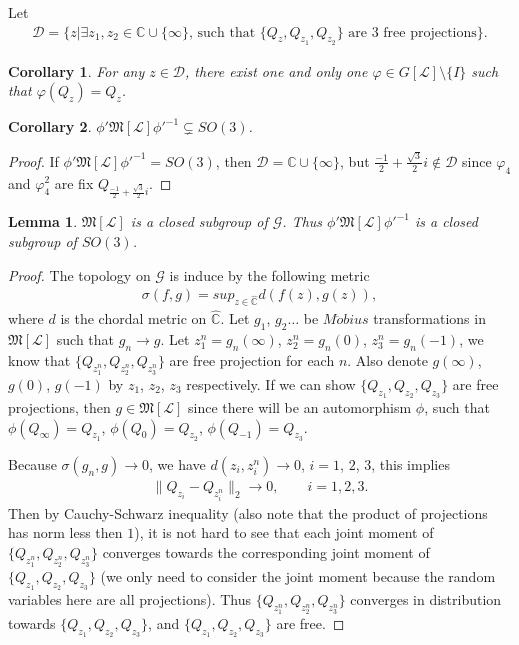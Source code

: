 \documentclass{amsart}
\newcommand{\DDD}{\mathcal D}
\newcommand{\G}{\mathcal G}
\newcommand{\LLL}{\mathcal L} %
\newcommand{\MMM}{\mathfrak M}
\newcommand{\C}{\mathbb C} %
\newtheorem{corollary}{Corollary}[section]
\newtheorem{lemma}{Lemma}[section]
\begin{document}
Let
\begin{align*}
\DDD = \{z | \exists z_1, z_2 \in \C \cup \{\infty \} \mbox{, such that } \{ Q_z, Q_{z_1}, Q_{z_2} \} \mbox{ are 3 free projections} \}.
\end{align*}

\begin{corollary}
For any $z \in \DDD$, there exist one and only one $\varphi \in G[\LLL] \setminus \{I \}$ such that $\varphi(Q_z) = Q_z$.
\end{corollary}

\begin{corollary}
$\phi' \MMM[\LLL] \phi'^{-1} \subsetneq SO(3)$.
\end{corollary}

\begin{proof}
If $\phi' \MMM[\LLL] \phi'^{-1} = SO(3)$, then $\DDD = \C \cup \{\infty \}$, but $\frac{-1}{2} + \frac{\sqrt{3}}{2}i \notin \DDD$ since
$\varphi_4$ and $\varphi_{4}^{2}$ are fix $Q_{\frac{-1}{2} + \frac{\sqrt{3}}{2}i}$.
\end{proof}

\begin{lemma}
$\MMM[\LLL]$ is a closed subgroup of $\G$. Thus $\phi' \MMM[\LLL] \phi'^{-1}$ is a closed subgroup of $SO(3)$.
\end{lemma}

\begin{proof}
The topology on $\G$ is induce by the following metric
\begin{align*}
\sigma(f,g) = sup_{z \in \widehat{\C}}d(f(z), g(z)),
\end{align*}
where $d$ is the chordal metric on $\widehat{\C}$.
Let $g_1$, $g_2 \ldots$ be $M\ddot{o}bius$ transformations in $\MMM[\LLL]$ such that $g_n \rightarrow g$.
Let $z_{1}^{n} = g_n(\infty)$, $z_{2}^{n} = g_n(0)$, $z_{3}^{n} = g_n(-1)$, we know that $\{Q_{z_{1}^{n}}, Q_{z_{2}^{n}},
Q_{z_{3}^{n}} \}$ are free projection for each $n$. Also denote $g(\infty)$, $g(0)$, $g(-1)$ by $z_1$, $z_2$, $z_3$ respectively.
If we can show $\{Q_{z_{1}}, Q_{z_{2}},Q_{z_{3}} \}$ are free projections, then $g \in \MMM[\LLL]$ since there will be an
automorphism $\phi$, such that $\phi(Q_{\infty}) = Q_{z_1}$, $\phi(Q_{0}) = Q_{z_2}$, $\phi(Q_{-1}) = Q_{z_3}$.

Because $\sigma(g_n,g) \rightarrow 0$, we have $d(z_i, z^{n}_{i}) \rightarrow 0$, $i = 1$, $2$, $3$, this implies
\begin{align*}
\|Q_{z_i} - Q_{z^{n}_{i}}\|_2 \rightarrow 0, \qquad i = 1, 2, 3.
\end{align*}
Then by Cauchy-Schwarz inequality (also note that the product of projections has norm less then $1$), it is not hard to see that
each joint moment of $\{Q_{z_{1}^{n}}, Q_{z_{2}^{n}},Q_{z_{3}^{n}} \}$ converges
towards the corresponding joint moment of $\{Q_{z_{1}}, Q_{z_{2}},Q_{z_{3}} \}$
(we only need to consider the joint moment because the random variables here are all
projections). Thus $\{Q_{z_{1}^{n}}, Q_{z_{2}^{n}},Q_{z_{3}^{n}} \}$ converges in
distribution towards $\{Q_{z_{1}}, Q_{z_{2}},Q_{z_{3}} \}$, and $\{Q_{z_{1}}, Q_{z_{2}},Q_{z_{3}} \}$ are free.
\end{proof}
\end{document}

